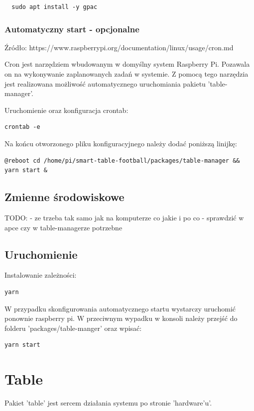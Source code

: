 \begin{lstlisting}
  sudo apt install -y gpac
\end{lstlisting}


\subsubsection{Automatyczny start - opcjonalne}
Źródło: https://www.raspberrypi.org/documentation/linux/usage/cron.md

Cron jest narzędziem wbudowanym w domyślny system Raspberry Pi. Pozawala on na wykonywanie zaplanowanych zadań w systemie. Z pomocą tego narzędzia jest realizowana możliwość automatycznego uruchomiania pakietu 'table-manager'.

Uruchomienie oraz konfiguracja crontab:
\begin{lstlisting}
crontab -e
\end{lstlisting}

Na końcu otworzonego pliku konfiguracyjnego należy dodać poniższą linijkę:
\begin{lstlisting}[breaklines=true]
@reboot cd /home/pi/smart-table-football/packages/table-manager && yarn start &
\end{lstlisting}

\subsection{Zmienne środowiskowe}
TODO:
- ze trzeba tak samo jak na komputerze co jakie i po co
- sprawdzić w apce czy w table-managerze potrzebne


\subsection{Uruchomienie}

Instalowanie zależności:

\begin{lstlisting}
yarn
\end{lstlisting}

W przypadku skonfigurowania automatycznego startu wystarczy uruchomić ponownie raspberry pi. W przeciwnym wypadku w konsoli należy przejść do folderu 'packages/table-manger' oraz wpisać:

\begin{lstlisting}
yarn start
\end{lstlisting}

\section{Table}
Pakiet 'table' jest sercem działania systemu po stronie 'hardware'u'.

